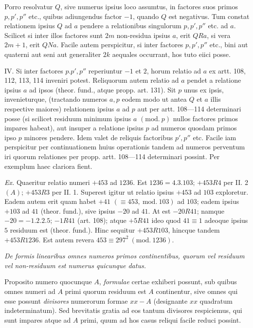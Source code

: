 Porro resolvatur $Q$, sive numerus ipsius loco assumtus, in factores suos primos $p,p',p''$ etc., quibus adiungendus factor $-1$, quando $Q$ est negativus. Tum constat relationem ipsius $Q$ ad $a$ pendere a relationibus singulorum $p,p',p''$ etc. ad $a$. Scilicet si inter illos factores sunt $2m$ non-residua ipsius $a$, erit $QRa$, si vera $2m+1$, erit $QNa$. Facile autem perspicitur, si inter factores $p,p',p''$ etc., bini aut quaterni aut seni aut generaliter $2k$ aequales occurrant, hos tuto eiici posse.

IV. Si inter factores $p.p',p''$ reperiuntur $-1$ et $2$, horum relatio ad $a$ ex artt. 108, 112, 113, 114 inveniri potest. Reliquorum autem relatio ad $a$ pendet a relatione ipsius $a$ ad ipsos (theor. fund., atque propp. art. 131). Sit $p$ unus ex ipsis, invenieturque, (tractando numeros $a,p$ eodem modo ut antea $Q$ et $a$ illis respective maiores) relationem ipsius $a$ ad $p$ aut per artt. 108---114 determinari posse (si scilicet residuum minimum ipsius $a$ $(\mathrm{mod.}\ p)$ nullos factores primos impares habeat), aut insuper a relatione ipsius $p$ ad numeros quosdam primos ipso $p$ minores pendere. Idem valet de reliquis factoribus $p',p''$ etc. Facile iam perspicitur per continuationem huius operationis tandem ad numeros perventum iri quorum relationes per propp. artt. 108---114 determinari possint. Per exemplum haec clariora fient.

\textit{Ex.} Quaeritur relatio numeri $+453$ ad $1236$. Est $1236=4.3.103$; $+453R4$ per II. 2 $(A)$; $+453R3$ per II. 1. Superest igitur ut relatio ipsius $+453$ ad $103$ exploretur. Eadem autem erit quam habet $+41$ $(\equiv453,\ \mathrm{mod.}\ 103)$ ad $103$; eadem ipsius $+103$ ad $41$ (theor. fund.), sive ipsius $-20$ ad $41$. At est $-20R41$; namque $-20=-1.2.2.5$; $-1R41$ (art. 108); atque $+5R41$ ideo quod $41\equiv1$ adeoque ipsius $5$ residuum est (theor. fund.). Hinc sequitur $+453R103$, hincque tandem $+453R1236$. Est autem revera $453\equiv297^2\ (\mathrm{mod.}\ 1236)$.

\begin{center}
\textit{De formis linearibus omnes numeros primos continentibus, quorum vel residuum vel non-residuum est numerus quicunque datus.}
\end{center}


Proposito numero quocunque $A$, \textit{formulae} certae exhiberi possunt, sub quibus omnes numeri ad $A$ primi quorum residuum est $A$ continentur, sive omnes qui esse possunt \textit{divisores} numerorum formae $xx-A$ (designante $xx$ quadratum indeterminatum). Sed brevitatis gratia ad eos tantum divisores respiciemus, qui sunt impares atque ad $A$ primi, quum ad hos casus reliqui facile reduci possint.

